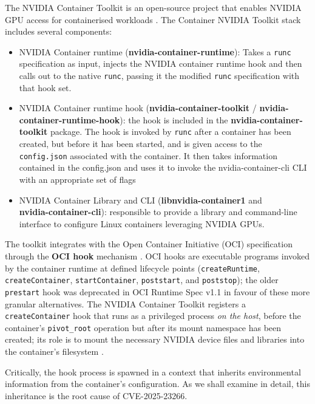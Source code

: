 The NVIDIA Container Toolkit is an open-source project that enables NVIDIA GPU access for containerised workloads \cite{nvidia_ctk_github}. The Container NVIDIA Toolkit stack includes several components:
\begin{itemize}
  \item NVIDIA Container runtime (\textbf{nvidia-container-runtime}): Takes a \texttt{runc} specification as input, injects the NVIDIA container runtime hook and then calls out to the native \texttt{runc}, passing it the modified \texttt{runc} specification with that hook set.
  \item NVIDIA Container runtime hook (\textbf{nvidia-container-toolkit} / \textbf{nvidia-container-runtime-hook}): the hook is included in the \textbf{nvidia-container-toolkit} package. The hook is invoked by \texttt{runc} after a container has been created, but before it has been started, and is given access to the \texttt{config.json} associated with the container.
  It then takes information contained in the config.json and uses it to invoke the nvidia-container-cli CLI with an appropriate set of flags
  \item NVIDIA Container Library and CLI (\textbf{libnvidia-container1} and \\ \textbf{nvidia-container-cli}): responsible to provide a library and command-line interface to configure Linux containers leveraging NVIDIA GPUs.
\end{itemize}
The toolkit integrates with the Open Container Initiative (OCI) specification through the \textbf{OCI hook} mechanism \cite{oci_runtime_spec} \cite{oci_image_spec}. OCI hooks are executable programs invoked by the container runtime at defined lifecycle points (\texttt{createRuntime}, \texttt{createContainer}, \texttt{startContainer}, \texttt{poststart}, and \texttt{poststop}); the older \texttt{prestart} hook was deprecated in OCI Runtime Spec v1.1 in favour of these more granular alternatives. The NVIDIA Container Toolkit registers a \texttt{createContainer} hook that runs as a privileged process \textit{on the host}, before the container's \texttt{pivot\_root} operation but after its mount namespace has been created; its role is to mount the necessary NVIDIA device files and libraries into the container's filesystem \cite{nvidia_ctk_docs}.

Critically, the hook process is spawned in a context that inherits environmental information from the container's configuration. As we shall examine in detail, this inheritance is the root cause of CVE-2025-23266.
 
